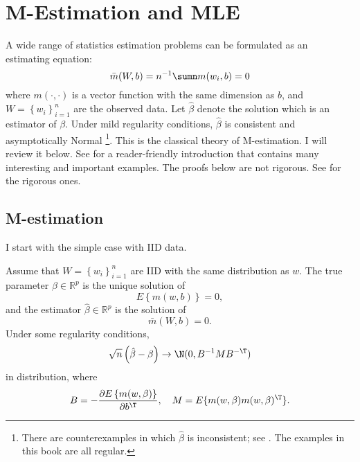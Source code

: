  
\chapter{M-Estimation and MLE}
\label{chapter::m-mle} 

 
A wide range of statistics estimation problems can be formulated as an estimating equation:
$$
\bar{m}(W,b) = n^{-1}\sumn m(w_{i},b) = 0
$$
where $m(\cdot, \cdot)$ is a vector function with the same dimension as $b$, and $W = \left\{ w_{i}\right\} _{i=1}^{n}$ are the observed data. 
Let $\hat{\beta} $ denote the solution which is an estimator of $\beta$. Under mild regularity conditions,  $\hat{\beta} $ is consistent and asymptotically Normal \footnote{There are counterexamples in which $\hat{\beta} $ is inconsistent; see \citet{freedman1982inconsistent}. The examples in this book are all regular.}. 
This is the classical theory of M-estimation. I will review it below. See \citet{stefanski2002calculus} for a reader-friendly introduction that contains many interesting and important examples. The proofs below are not rigorous. 
See \citet{newey1994large} for the rigorous ones. 


\section{M-estimation}



I start with the simple case with IID data. 


\begin{theorem}
\label{theorem:sandwich-theorem-cov-iid}Assume that $W = \left\{ w_{i}\right\} _{i=1}^{n}$ are IID with the same distribution as $w$.
The true parameter $\beta\in\mathbb{R}^{p}$ is the unique solution of  
\[
E\left\{ m(w,b)\right\} =0,
\]
and the estimator $\hat{\beta}\in\mathbb{R}^{p}$ is the solution of
\[
\bar{m}(W,b)  =0 . 
\]
Under some regularity conditions, 
\[
\sqrt{n}\left(\hat{\beta}-\beta\right)\rightarrow\N(0,B^{-1}MB^{-\T})
\]
in distribution, where 
$$
B   = -  \frac{\partial E\left\{ m(w,\beta) \right\} }{\partial b^{\T}},\quad 
M = E\{  m(w,\beta) m(w,\beta)^{\T}\}  .
$$
\end{theorem}







